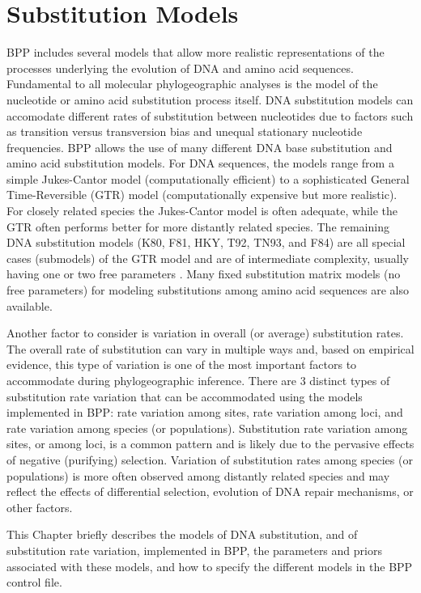 \documentclass[a4paper]{book}
\numberwithin{equation}{section} \renewcommand{\baselinestretch}{0.55}
\begin{document}
\chapter{Substitution Models} \label{substitutions}
BPP includes several models that allow more realistic representations
of the processes underlying the evolution of DNA and amino acid
sequences. Fundamental to all molecular phylogeographic analyses is
the model of the nucleotide or amino acid substitution process
itself. DNA substitution models can accomodate different rates of
substitution between nucleotides due to factors such as transition
versus transversion bias and unequal stationary nucleotide
frequencies.  BPP allows the use of many different DNA base substitution
and amino acid substitution models. For DNA sequences, the models
range from a simple Jukes-Cantor model (computationally efficient) to a sophisticated General
Time-Reversible (GTR) model (computationally expensive but more
realistic).  For closely related species the Jukes-Cantor model is
often adequate, while the GTR often performs better for more distantly
related species. The remaining DNA substitution models (K80, F81,
HKY, T92, TN93, and F84) are all special cases (submodels) of the GTR model
and are of intermediate complexity, usually having one or two free
parameters \citep[see][]{Yang2014b}. Many fixed substitution matrix
models (no free parameters) for modeling substitutions among amino
acid sequences are also available. 

Another factor to consider is variation in overall (or average)
substitution rates.  The overall rate of substitution can vary in
multiple ways and, based on empirical evidence, this type of variation
is one of the most important factors to accommodate during
phylogeographic inference.  There are 3 distinct types of substitution
rate variation that can be accommodated using the models implemented
in BPP: rate variation among sites, rate variation among loci, and
rate variation among species (or populations). Substitution rate
variation among sites, or among loci, is a common pattern and
is likely due to the pervasive effects of negative (purifying)
selection. Variation of substitution rates among species (or
populations) is more often observed among distantly related species
and may reflect the effects of differential selection, evolution of
DNA repair mechanisms, or other factors.

This Chapter briefly describes the models of DNA substitution, and of
substitution rate variation, implemented in BPP, the parameters and
priors associated with these models, and how to specify the different
models in the BPP control file.
\end{document}
